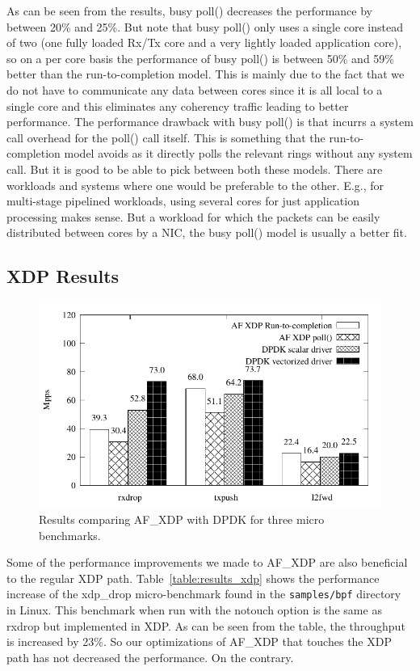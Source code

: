 \documentclass[9pt,numbers,reprint]{sigplanconf}
\begin{document}
As can be seen from the results, busy poll() decreases the performance
by between 20\% and 25\%. But note that busy poll() only uses a single
core instead of two (one fully loaded Rx/Tx core and a very lightly
loaded application core), so on a per core basis the performance of
busy poll() is between 50\% and 59\% better than the run-to-completion
model. This is mainly due to the fact that we do not have to
communicate any data between cores since it is all local to a single
core and this eliminates any coherency traffic leading to better
performance. The performance drawback with busy poll() is that incurrs
a system call overhead for the poll() call itself. This is something
that the run-to-completion model avoids as it directly polls the
relevant rings without any system call. But it is good to
be able to pick between both these models. There are workloads and
systems where one would be preferable to the other. E.g., for
multi-stage pipelined workloads, using several cores for just
application processing makes sense. But a workload for which the
packets can be easily distributed between cores by a NIC, the
busy poll() model is usually a better fit.


\subsection{XDP Results}
\label{sec:exp:xdpres}

\begin{figure}[ht]
\centering
\includegraphics{results_dpdk.pdf}
\caption{Results comparing AF\_XDP with DPDK for three micro benchmarks.}
\label{fig:results_dpdk}
\end{figure}

% 

Some of the performance improvements we made to AF\_XDP are also
beneficial to the regular XDP path. Table~\ref{table:results_xdp}
shows the performance increase of the xdp\_drop micro-benchmark found
in the \texttt{samples/bpf} directory in Linux. This benchmark when run
with the notouch option is the same as rxdrop but implemented in
XDP. As can be seen from the table, the throughput is increased by
23\%. So our optimizations of AF\_XDP that touches the XDP path has
not decreased the performance. On the contrary.
\end{document}
